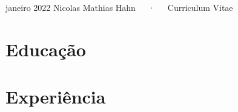 \documentclass[11pt, a4paper]{awesome-cv}
\begin{document}
\makecvheader

\makecvfooter
  {janeiro 2022}
    {Nicolas Mathias Hahn~~~·~~~Curriculum Vitae}
  {\thepage}





\hypertarget{educauxe7uxe3o}{%
\section{Educação}\label{educauxe7uxe3o}}

\begin{cventries}
    \vspace{-4.0mm}
    \vspace{-4.0mm}
\end{cventries}

\hypertarget{experiuxeancia}{%
\section{Experiência}\label{experiuxeancia}}
\end{document}
